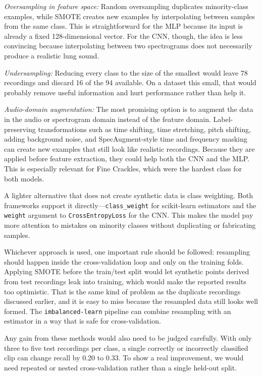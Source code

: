 \documentclass[conference]{IEEEtran}
\begin{document}
\textit{Oversampling in feature space:} Random oversampling duplicates
minority-class examples, while SMOTE creates new examples by
interpolating between samples from the same class. This is straightforward for
the MLP because its input is already a fixed 128-dimensional vector. For the CNN,
though, the idea is less convincing because interpolating between two
spectrograms does not necessarily produce a realistic lung sound.

\textit{Undersampling:} Reducing every class to the size of the smallest would
leave 78 recordings and discard 16 of the 94 available. On a dataset this small,
that would probably remove useful information and hurt performance rather than
help it.

\textit{Audio-domain augmentation:} The most promising option is to augment the
data in the audio or spectrogram domain instead of the feature domain.
Label-preserving transformations such as time shifting, time stretching, pitch
shifting, adding background noise, and SpecAugment-style time and frequency
masking can create new examples that still look like realistic
recordings. Because they are applied before feature extraction, they could help
both the CNN and the MLP. This is especially relevant for Fine Crackles, which
were the hardest class for both models.

A lighter alternative that does not create synthetic data is class weighting.
Both frameworks support it directly---\texttt{class\_weight} for scikit-learn
estimators and the \texttt{weight} argument to \texttt{CrossEntropyLoss} for the
CNN. This makes the model pay more attention to mistakes on minority classes
without duplicating or fabricating samples.

Whichever approach is used, one important rule should be followed: resampling
should happen inside the cross-validation loop and only on the training folds.
Applying SMOTE before the train/test split would let synthetic points derived
from test recordings leak into training, which would make the reported results
too optimistic. That is the same kind of problem as the duplicate recordings
discussed earlier, and it is easy to miss because the resampled data still looks
well formed. The \texttt{imbalanced-learn} pipeline can combine
resampling with an estimator in a way that is safe for cross-validation.

Any gain from these methods would also need to be judged carefully. With only
three to five test recordings per class, a single correctly or incorrectly
classified clip can change recall by 0.20 to 0.33. To show a real improvement,
we would need repeated or nested cross-validation rather than a single held-out
split.
\end{document}
